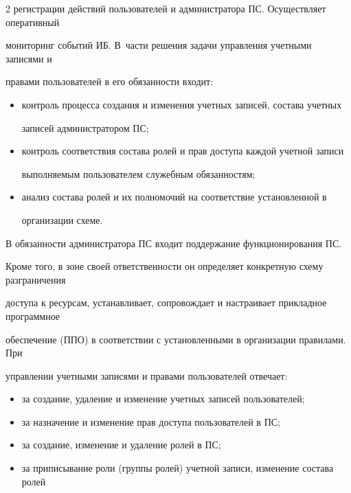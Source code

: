 \begin{multicols}{2}
регистрации действий пользователей и администратора ПС. Осуществляет оперативный 


мониторинг событий ИБ. В~части решения задачи управления учетными записями и 


правами пользователей в его обязанности входит: 


       \begin{itemize}


\item контроль процесса создания и изменения учетных записей, состава учетных 


записей администратором ПС; 


\item контроль соответствия состава ролей и прав доступа каждой учетной записи 


выполняемым пользователем служебным обязанностям; 


\item анализ состава ролей и их полномочий на соответствие уста\-нов\-лен\-ной в 


организации схеме.


\end{itemize}


       


       В обязанности администратора ПС входит поддержание функционирования ПС. 


Кроме того, в зоне своей ответственности он определяет конкретную схему разграничения 


доступа к ресурсам, устанавливает, сопровождает и настраивает прикладное программное 


обеспечение (ППО) в соответствии с уста\-нов\-лен\-ны\-ми в организации правилами. При 


управлении учетными записями и правами пользователей отвечает: 


       \begin{itemize}


\item за создание, удаление и изменение учетных записей пользователей; 


\item за назначение и изменение прав доступа пользователей в ПС; 


\item за создание, изменение и удаление ролей в ПС; 


\item за приписывание роли (группы ролей) учетной записи, изменение состава ролей 



\end{itemize}
\end{multicols}

